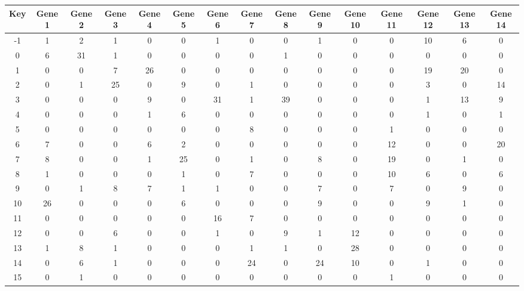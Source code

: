 \begin{tabular}{|c|c|c|c|c|c|c|c|c|c|c|c|c|c|c|}
\hline
Key & Gene 1 & Gene 2 & Gene 3 & Gene 4 & Gene 5 & Gene 6 & Gene 7 & Gene 8 & Gene 9 & Gene 10 & Gene 11 & Gene 12 & Gene 13 & Gene 14 \\
\hline
-1 & 1 & 2 & 1 & 0 & 0 & 1 & 0 & 0 & 1 & 0 & 0 & 10 & 6 & 0 \\
0 & 6 & 31 & 1 & 0 & 0 & 0 & 0 & 1 & 0 & 0 & 0 & 0 & 0 & 0 \\
1 & 0 & 0 & 7 & 26 & 0 & 0 & 0 & 0 & 0 & 0 & 0 & 19 & 20 & 0 \\
2 & 0 & 1 & 25 & 0 & 9 & 0 & 1 & 0 & 0 & 0 & 0 & 3 & 0 & 14 \\
3 & 0 & 0 & 0 & 9 & 0 & 31 & 1 & 39 & 0 & 0 & 0 & 1 & 13 & 9 \\
4 & 0 & 0 & 0 & 1 & 6 & 0 & 0 & 0 & 0 & 0 & 0 & 1 & 0 & 1 \\
5 & 0 & 0 & 0 & 0 & 0 & 0 & 8 & 0 & 0 & 0 & 1 & 0 & 0 & 0 \\
6 & 7 & 0 & 0 & 6 & 2 & 0 & 0 & 0 & 0 & 0 & 12 & 0 & 0 & 20 \\
7 & 8 & 0 & 0 & 1 & 25 & 0 & 1 & 0 & 8 & 0 & 19 & 0 & 1 & 0 \\
8 & 1 & 0 & 0 & 0 & 1 & 0 & 7 & 0 & 0 & 0 & 10 & 6 & 0 & 6 \\
9 & 0 & 1 & 8 & 7 & 1 & 1 & 0 & 0 & 7 & 0 & 7 & 0 & 9 & 0 \\
10 & 26 & 0 & 0 & 0 & 6 & 0 & 0 & 0 & 9 & 0 & 0 & 9 & 1 & 0 \\
11 & 0 & 0 & 0 & 0 & 0 & 16 & 7 & 0 & 0 & 0 & 0 & 0 & 0 & 0 \\
12 & 0 & 0 & 6 & 0 & 0 & 1 & 0 & 9 & 1 & 12 & 0 & 0 & 0 & 0 \\
13 & 1 & 8 & 1 & 0 & 0 & 0 & 1 & 1 & 0 & 28 & 0 & 0 & 0 & 0 \\
14 & 0 & 6 & 1 & 0 & 0 & 0 & 24 & 0 & 24 & 10 & 0 & 1 & 0 & 0 \\
15 & 0 & 1 & 0 & 0 & 0 & 0 & 0 & 0 & 0 & 0 & 1 & 0 & 0 & 0 \\
\hline
\end{tabular}